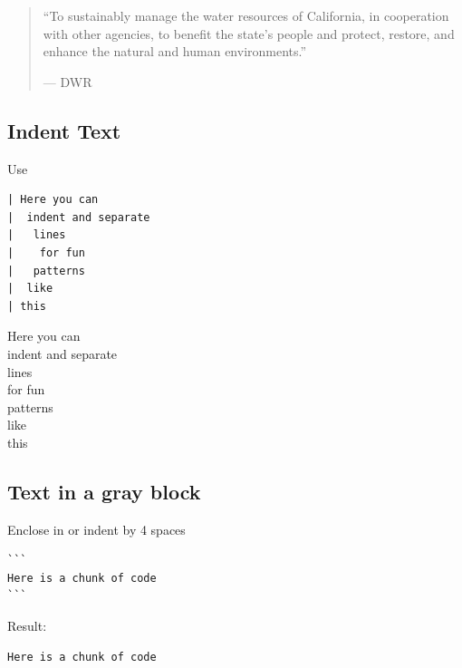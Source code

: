 \documentclass[
]{book}
\begin{document}
\begin{quote}
``To sustainably manage the water resources of California, in cooperation with other
agencies, to benefit the state's people and protect, restore, and
enhance the natural and human environments.''

--- DWR
\end{quote}

\hypertarget{indent-text}{%
\subsection{Indent Text}\label{indent-text}}

Use \texttt{\textbar{}}

\begin{verbatim}
| Here you can 
|  indent and separate 
|   lines
|    for fun 
|   patterns
|  like
| this 
\end{verbatim}

Here you can\\
\hspace*{0.333em}indent and separate\\
\hspace*{0.333em}\hspace*{0.333em}lines\\
\hspace*{0.333em}\hspace*{0.333em}\hspace*{0.333em}for fun\\
\hspace*{0.333em}\hspace*{0.333em}patterns\\
\hspace*{0.333em}like\\
this

\hypertarget{text-in-a-gray-block}{%
\subsection{Text in a gray block}\label{text-in-a-gray-block}}

Enclose in \texttt{\textasciigrave{}\textasciigrave{}\textasciigrave{}} or indent by 4 spaces

\begin{verbatim}
``` 
Here is a chunk of code 
```    
\end{verbatim}

Result:

\begin{verbatim}
Here is a chunk of code
\end{verbatim}
\end{document}
